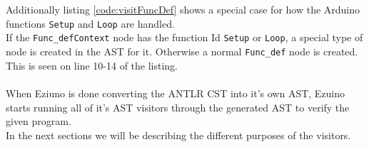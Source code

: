 \\\\
Additionally listing \ref{code:visitFuncDef} shows a special case for how the Arduino functions \texttt{Setup} and \texttt{Loop} are handled.\\
If the \texttt{Func\_defContext} node has the function Id \texttt{Setup} or \texttt{Loop}, a special type of node is created in the AST for it. Otherwise a normal \texttt{Func\_def} node is created. This is seen on line 10-14 of the listing.
\\\\
When Eziuno is done converting the ANTLR CST into it's own AST, Ezuino starts running all of it's AST visitors through the generated AST to verify the given program.\\
In the next sections we will be describing the different purposes of the visitors.\\
